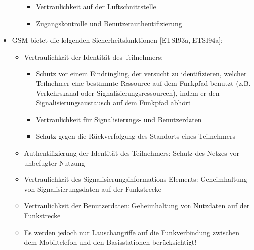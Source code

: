 \documentclass[a4paper]{article}
\begin{document}
\begin{multicols}{3}
\begin{itemize}
\begin{itemize}
                        \begin{itemize}
                            \item
                                  Vertraulichkeit auf der Luftschnittstelle
                            \item
                                  Zugangskontrolle und Benutzerauthentifizierung
                        \end{itemize}
              \end{itemize}
        \item
              GSM bietet die folgenden Sicherheitsfunktionen {[}ETSI93a, ETSI94a{]}:

              \begin{itemize}
                  \item
                        Vertraulichkeit der Identität des Teilnehmers:

                        \begin{itemize}
                            \item
                                  Schutz vor einem Eindringling, der versucht zu identifizieren,
                                  welcher Teilnehmer eine bestimmte Ressource auf dem Funkpfad
                                  benutzt (z.B. Verkehrskanal oder Signalisierungsressourcen), indem
                                  er den Signalisierungsaustausch auf dem Funkpfad abhört
                            \item
                                  Vertraulichkeit für Signalisierungs- und Benutzerdaten
                            \item
                                  Schutz gegen die Rückverfolgung des Standorts eines Teilnehmers
                        \end{itemize}
                  \item
                        Authentifizierung der Identität des Teilnehmers: Schutz des Netzes
                        vor unbefugter Nutzung
                  \item
                        Vertraulichkeit des Signalisierungsinformations-Elements:
                        Geheimhaltung von Signalisierungsdaten auf der Funkstrecke
                  \item
                        Vertraulichkeit der Benutzerdaten: Geheimhaltung von Nutzdaten auf
                        der Funkstrecke
                  \item
                        Es werden jedoch nur Lauschangriffe auf die Funkverbindung zwischen
                        dem Mobiltelefon und den Basisstationen berücksichtigt!
              \end{itemize}
    \end{itemize}


\end{multicols}
\end{document}
